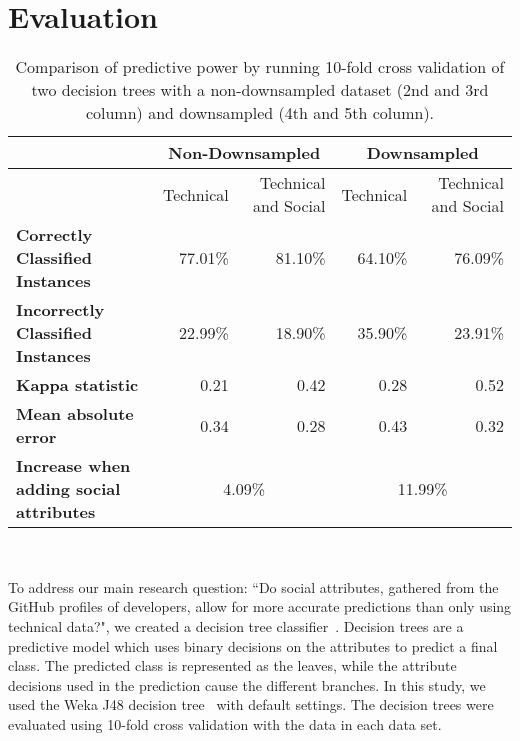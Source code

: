\documentclass[10pt, conference]{IEEEtran}
\begin{document}
\section{Evaluation}
\begin{table*}[ht]
\centering
\begin{tabular}{l||r|r||r|r}
  & \multicolumn{2}{|c||}{Non-Downsampled}  & \multicolumn{2}{|c}{Downsampled} \\
\hline
  & Technical & Technical and Social & Technical & Technical and Social \\
\hline
\textbf{Correctly Classified Instances}&  77.01\% & 81.10\%  & 64.10\% & 76.09\%\\

\textbf{Incorrectly Classified Instances}&  22.99\% & 18.90\% & 35.90\% & 23.91\%\\

\textbf{Kappa statistic}& 0.21 &  0.42 & 0.28  & 0.52 \\

\textbf{Mean absolute error}& 0.34 &  0.28 & 0.43 & 0.32\\

\hline
\textbf{Increase when adding social attributes}& \multicolumn{2}{|c||}{4.09\%}  & \multicolumn{2}{|c}{11.99\%}\\

\hline
\end{tabular}
\\
\center
	\caption{\label{resultsTable}Comparison of predictive power by running 10-fold
    cross validation of two decision trees with a non-downsampled dataset (2nd and 3rd column) and downsampled (4th and 5th column). 
	}   
\end{table*}
To address our main research question: ``Do social attributes, gathered 
from the GitHub profiles of developers,
allow for more accurate predictions than only using technical data?", we 
created a decision tree classifier~\cite{Quinlan86}.
Decision trees are a predictive model which uses binary decisions on the
attributes to predict a final class.  The predicted class is represented as the
leaves, while the attribute decisions used in the prediction cause the
different branches.
In this study, we used the Weka J48 decision tree~\cite{Weka,Quinlan1993}
with default settings. The decision trees were evaluated using 10-fold cross 
validation with the data in each data set.
\end{document}
